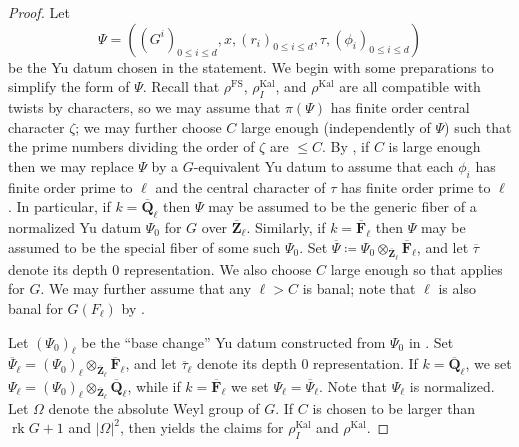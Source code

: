 \documentclass[reqno]{amsart}
\numberwithin{equation}{subsection}
\newcommand{\F}{\mathbf{F}}
\newcommand{\Q}{\mathbf{Q}}
\newcommand{\Z}{\mathbf{Z}}
\newcommand{\ol}[1]{\overline{#1}}
\DeclareMathOperator{\FS}{FS}
\DeclareMathOperator{\Kal}{Kal}
\DeclareMathOperator{\rk}{rk}
\theoremstyle{remark}
\numberwithin{equation}{subsection}
\numberwithin{figure}{subsection}
\begin{document}
\begin{proof}
Let
\[
\Psi = ((G^i)_{0 \leq i \leq d}, x, (r_i)_{0 \leq i \leq d}, \tau, (\phi_i)_{0 \leq i \leq d})
\]
be the Yu datum chosen in the statement. We begin with some preparations to simplify the form of $\Psi$. Recall that $\rho^{\FS}$, $\rho_I^{\Kal}$, and $\rho^{\Kal}$ are all compatible with twists by characters, so we may assume that $\pi(\Psi)$ has finite order central character $\zeta$; we may further choose $C$ large enough (independently of $\Psi$) such that the prime numbers dividing the order of $\zeta$ are $\leq C$. By \cite[Proposition~6.6.3 and Lemma~6.6.5]{CF26a}, if $C$ is large enough then we may replace $\Psi$ by a $G$-equivalent Yu datum to assume that each $\phi_i$ has finite order prime to $\ell$ and the central character of $\tau$ has finite order prime to $\ell$. In particular, if $k = \ol\Q_\ell$ then $\Psi$ may be assumed to be the generic fiber of a normalized Yu datum $\Psi_0$ for $G$ over $\ol\Z_\ell$. Similarly, if $k = \ol\F_\ell$ then $\Psi$ may be assumed to be the special fiber of some such $\Psi_0$. Set $\ol\Psi \coloneqq \Psi_0 \otimes_{\ol\Z_\ell} \ol\F_\ell$, and let $\ol\tau$ denote its depth $0$ representation. We also choose $C$ large enough so that \cite[Theorem 1.3.1]{F24} applies for $G$. We may further assume that any $\ell > C$ is banal; note that $\ell$ is also banal for $G(F_\ell)$ by \cite[Proposition~4.1.2(2)]{Cot26b}.

Let $(\Psi_0)_\ell$ be the ``base change'' Yu datum constructed from $\Psi_0$ in \cite[\S 8.2]{CF26a}. Set $\ol\Psi_\ell = (\Psi_0)_\ell \otimes_{\ol\Z_\ell} \ol\F_\ell$, and let $\ol\tau_\ell$ denote its depth $0$ representation. If $k = \ol\Q_\ell$, we set $\Psi_\ell = (\Psi_0)_\ell \otimes_{\ol\Z_\ell} \ol\Q_\ell$, while if $k = \ol\F_\ell$ we set $\Psi_\ell = \ol\Psi_\ell$. Note that $\Psi_\ell$ is normalized. Let $\Omega$ denote the absolute Weyl group of $G$. If $C$ is chosen to be larger than $\rk G + 1$ and $|\Omega|^2$, then \cite[Proposition~8.2.3]{CF26a} yields the claims for $\rho_I^{\Kal}$ and $\rho^{\Kal}$.


\end{proof}
\end{document}
